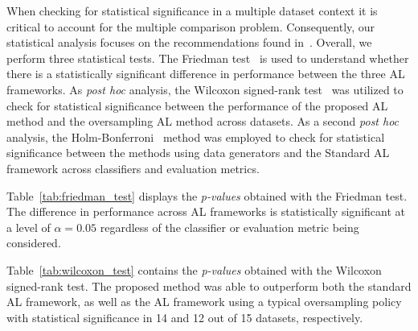 \documentclass[parskip=full]{scrartcl}
\begin{document}
When checking for statistical significance in a multiple dataset context it is
critical to account for the multiple comparison problem. Consequently, our
statistical analysis focuses on the recommendations found
in~\cite{Demsar2006}. Overall, we perform three statistical tests. The
Friedman test~\cite{Friedman1937} is used to understand whether there is a
statistically significant difference in performance between the three AL
frameworks. As \textit{post hoc} analysis, the Wilcoxon signed-rank
test~\cite{Wilcoxon1945} was utilized to check for statistical significance
between the performance of the proposed AL method and the oversampling AL
method across datasets. As a second \textit{post hoc} analysis, the
Holm-Bonferroni~\cite{Holm1979} method was employed to check for statistical
significance between the methods using data generators and the Standard AL
framework across classifiers and evaluation metrics.
 
Table~\ref{tab:friedman_test} displays the \textit{p-values} obtained with the
Friedman test. The difference in performance across AL frameworks is
statistically significant at a level of $\alpha = 0.05$ regardless of the
classifier or evaluation metric being considered.

\begin{table}[t]
	\centering
    \caption{%
        Friedman test results. Statistical significance is tested at a level
        of $\alpha = 0.05$. The null hypothesis is that there is no difference
        in the classification outcome across oversamplers.
    }\label{tab:friedman_test}
\end{table}

Table~\ref{tab:wilcoxon_test} contains the \textit{p-values} obtained with the
Wilcoxon signed-rank test. The proposed method was able to outperform both the
standard AL framework, as well as the AL framework using a typical
oversampling policy with statistical significance in 14 and 12 out of 15
datasets, respectively.

\begin{table}[H]
	\centering
    \caption{%
        Adjusted p-values using the Wilcoxon signed-rank method. Bold values
        are statistically significant at a level of $\alpha = 0.05$. The null
        hypothesis is that the performance of the proposed framework is
        similar to that of the oversampling or standard framework.
    }\label{tab:wilcoxon_test}
\end{table}
\end{document}
